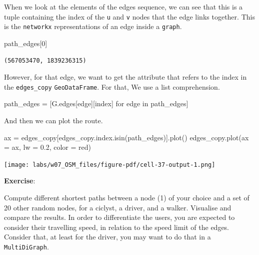 \documentclass[
  letterpaper,
  DIV=11,
  numbers=noendperiod]{scrreprt}
\newenvironment{Shaded}{\begin{snugshade}}{\end{snugshade}}
\newcommand{\ControlFlowTok}[1]{\textcolor[rgb]{0.00,0.23,0.31}{#1}}
\newcommand{\DecValTok}[1]{\textcolor[rgb]{0.68,0.00,0.00}{#1}}
\newcommand{\FloatTok}[1]{\textcolor[rgb]{0.68,0.00,0.00}{#1}}
\newcommand{\KeywordTok}[1]{\textcolor[rgb]{0.00,0.23,0.31}{#1}}
\newcommand{\NormalTok}[1]{\textcolor[rgb]{0.00,0.23,0.31}{#1}}
\newcommand{\OperatorTok}[1]{\textcolor[rgb]{0.37,0.37,0.37}{#1}}
\newcommand{\StringTok}[1]{\textcolor[rgb]{0.13,0.47,0.30}{#1}}
\begin{document}
When we look at the elements of the edges sequence, we can see that this
is a tuple containing the index of the \texttt{u} and \texttt{v} nodes
that the edge links together. This is the \texttt{networkx}
representations of an edge inside a \texttt{graph}.

\begin{Shaded}
\begin{Highlighting}[]
\NormalTok{path\_edges[}\DecValTok{0}\NormalTok{]}
\end{Highlighting}
\end{Shaded}

\begin{verbatim}
(567053470, 1839236315)
\end{verbatim}

However, for that edge, we want to get the attribute that refers to the
index in the \texttt{edges\_copy} \texttt{GeoDataFrame}. For that, We
use a list comprehension.

\begin{Shaded}
\begin{Highlighting}[]
\NormalTok{path\_edges }\OperatorTok{=}\NormalTok{ [G.edges[edge][}\StringTok{\textquotesingle{}index\textquotesingle{}}\NormalTok{] }\ControlFlowTok{for}\NormalTok{ edge }\KeywordTok{in}\NormalTok{ path\_edges]}
\end{Highlighting}
\end{Shaded}

And then we can plot the route.

\begin{Shaded}
\begin{Highlighting}[]
\NormalTok{ax }\OperatorTok{=}\NormalTok{ edges\_copy[edges\_copy.index.isin(path\_edges)].plot()}
\NormalTok{edges\_copy.plot(ax }\OperatorTok{=}\NormalTok{ ax, lw }\OperatorTok{=} \FloatTok{0.2}\NormalTok{, color }\OperatorTok{=} \StringTok{\textquotesingle{}red\textquotesingle{}}\NormalTok{)}
\end{Highlighting}
\end{Shaded}

\texttt{[image: labs/w07\_OSM\_files/figure-pdf/cell-37-output-1.png]}

\textbf{Exercise}:

Compute different shortest paths between a node (1) of your choice and a
set of 20 other random nodes, for a ciclyst, a driver, and a walker.
Visualise and compare the results. In order to differentiate the users,
you are expected to consider their travelling speed, in relation to the
speed limit of the edges. Consider that, at least for the driver, you
may want to do that in a \texttt{MultiDiGraph}.
\end{document}
